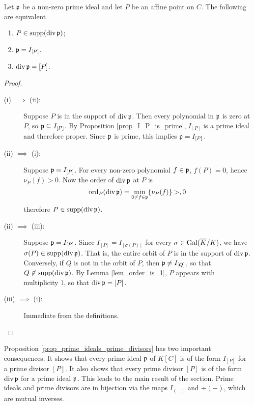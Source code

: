 \begin{proposition}
  \label{prop_prime_ideals_prime_divisors}
  Let $\frak p$ be a non-zero prime ideal and let $P$ be an affine point on $C$.
  The following are equivalent
  \begin{enumerate}[label=(\roman*)]
    \item $P \in \supp(\div \frak p)$;
    \item $\frak p = I_{[P]}$.
    \item $\div \frak p = [P]$.
  \end{enumerate}
\end{proposition}
\begin{proof}
  \begin{description}
    \item [(i) $\implies$ (ii):]
      Suppose $P$ is in the support of $\div \frak p$.
      Then every polynomial in $\frak p$ is zero at $P$, so $\frak p \subseteq I_{[P]}$.
      By Proposition \ref{prop_I_P_is_prime}, $I_{[P]}$ is a prime ideal and therefore proper.
      Since $\frak p$ is prime, this implies $\frak p = I_{[P]}$.

    \item [(ii) $\implies$ (i):]
      Suppose $\frak p = I_{[P]}$.
      For every non-zero polynomial $f \in \frak p$, $f(P) = 0$, hence $\nu_P(f) > 0$.
      Now the order of $\div \frak p$ at $P$ is
      \[ \ord_P(\div \frak p) = \min_{0 \neq f \in \frak p}\{ \nu_P(f) \} > ,0 \]
      therefore $P \in \supp(\div \frak p)$.

    \item [(ii) $\implies$ (iii):]
      Suppose $\frak p = I_{[P]}$.
      Since $I_{[P]} = I_{[\sigma(P)]}$ for every $\sigma \in \Gal(\bar K/K)$,
      we have $\sigma(P) \in \supp(\div \frak p)$.
      That is, the entire orbit of $P$ is in the support of $\div \frak p$.
      Conversely, if $Q$ is not in the orbit of $P$, then $\frak p \neq I_{[Q]}$,
      so that $Q \not \in \supp(\div \frak p)$.
      By Lemma \ref{lem_order_is_1}, $P$ appears with multiplicity 1, so that $\div \frak p = [P]$.
      
    \item [(iii) $\implies$ (i):]
      Immediate from the definitions.
  \end{description}
\end{proof}

Proposition \ref{prop_prime_ideals_prime_divisors} has two important consequences.
It shows that every prime ideal $\frak p$ of $K[C]$ is of the form $I_{[P]}$ for a prime divisor $[P]$.
It also shows that every prime divisor $[P]$ is of the form $\div \frak p$ for a prime ideal $\frak p$.
This leads to the main result of the section.
Prime ideals and prime divisors are in bijection via the maps $I_{(-)}$ and $\div(-)$, which are mutual inverses.

